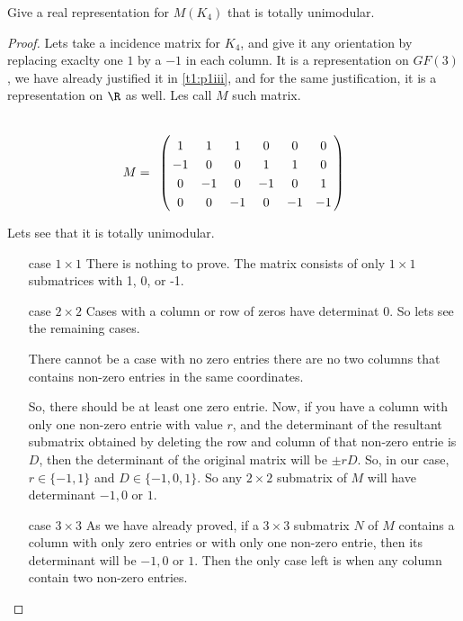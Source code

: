 \prob
{
    Give a real representation for $M(K_4)$ that is totally unimodular.
}
\begin{proof}
    Lets take a incidence matrix for $K_4$, and give it any orientation by replacing exaclty one $1$ by a $-1$ in each column. 
    It is a representation on $GF(3)$, we have already justified it in \ref{t1:p1iii}, and for the same justification, it is a 
    representation on $\R$ as well. Les call $M$ such matrix.\pn
    
    \begin{align}
        M =
            \bordermatrix{
                    &       &       &       &       &       &       \cr
                    &   1   &   1   &   1   &   0   &   0   &   0   \cr
                    &  -1   &   0   &   0   &   1   &   1   &   0   \cr
                    &   0   &  -1   &   0   &  -1   &   0   &   1   \cr
                    &   0   &   0   &  -1   &   0   &  -1   &  -1   
            }    
    \end{align}
    
    
    Lets see that it is totally unimodular.\pn
    
    \begin{itemize}
        \item [case $1 \times 1$] 
            There is nothing to prove. The matrix consists of only $1\times 1$ submatrices with 1, 0, or -1.
        
        \item [case $2 \times 2$] 
            Cases with a column or row of zeros have determinat 0. So lets see the remaining cases.\pn 
            
            There cannot be a case with no zero entries there are no two columns that contains non-zero entries in the same coordinates.\pn
            
            So, there should be at least one zero entrie. Now, if you have a column with only one non-zero entrie with value $r$, and the determinant of
            the resultant submatrix obtained by deleting the row and column of that non-zero entrie is $D$, then the determinant of the original
            matrix will be $\pm r D$. So, in our case, $r \in \{-1, 1\}$ and $D \in \{-1, 0, 1\}$. So any $2 \times 2$ submatrix of $M$ will have 
            determinant $-1, 0$ or $1$.
            
        \item [case $3 \times 3$]
            As we have already proved, if a $3 \times 3$ submatrix $N$ of $M$ contains a column with only zero entries or with only one non-zero entrie, then
            its determinant will be $-1, 0$ or $1$. Then the only case left is when any column contain two non-zero entries.\pn
            

\end{itemize}
\end{proof}
